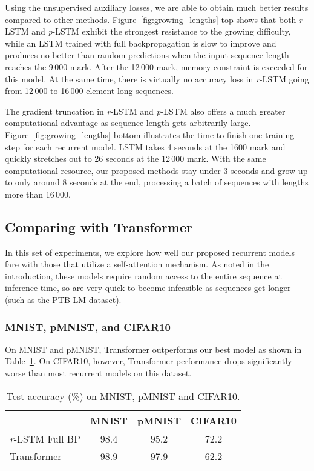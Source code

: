\documentclass{article}
\newcommand{\rlstm}{{\it r}-LSTM}
\newcommand{\plstm}{{\it p}-LSTM}
\begin{document}
Using the unsupervised auxiliary losses, we are able to obtain much better results compared to other methods. Figure~\ref{fig:growing_lengths}-top shows that both \rlstm{} and \plstm{} exhibit the strongest resistance to the growing difficulty, while an LSTM trained with full backpropagation is slow to improve and produces no better than random predictions when the input sequence length reaches the 9\,000 mark. After the 12\,000 mark, memory constraint is exceeded for this model. At the same time, there is virtually no accuracy loss in \rlstm{} going from 12\,000 to 16\,000 element long sequences. 

The gradient truncation in \rlstm{} and \plstm{} also offers a much greater computational advantage as sequence length gets arbitrarily large. Figure~\ref{fig:growing_lengths}-bottom illustrates the time to finish one training step for each recurrent model. LSTM takes 4 seconds at the 1600 mark and quickly stretches out to 26 seconds at the 12\,000 mark. With the same computational resource, our proposed methods stay under 3 seconds and grow up to only around 8 seconds at the end, processing a batch of sequences with lengths more than 16\,000.

\subsection{Comparing with Transformer} 
\label{sec:transformer}

In this set of experiments, we explore how well our proposed recurrent models fare with those that utilize a self-attention mechanism. As noted in the introduction, these models require random access to the entire sequence at inference time, so are very quick to become infeasible as sequences get longer (such as the PTB LM dataset).

\subsubsection{MNIST, pMNIST, and CIFAR10}

On MNIST and pMNIST, Transformer outperforms our best model as shown in Table~\ref{transformer_mnist_cifar}. On CIFAR10, however, Transformer performance drops significantly - worse than most recurrent models on this dataset. 

\begin{table}[htb]
\caption{Test accuracy (\%) on MNIST, pMNIST and CIFAR10.}
\label{transformer_mnist_cifar}
\vskip 0.15in
\begin{center}
\begin{small}
% 
\begin{tabular}{lccc}
\toprule
 & MNIST & pMNIST & CIFAR10 \\
\midrule
\rlstm{} Full BP & 98.4 & 95.2 & 72.2 \\
Transformer & 98.9 & 97.9 & 62.2 \\
\bottomrule

\end{tabular}
% 
\end{small}
\end{center}
\vskip -0.1in
\end{table}
\end{document}

